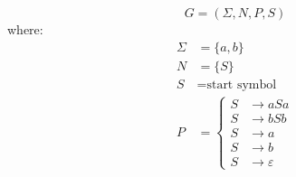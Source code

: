 \documentclass[aspectratio=169]{beamer}
\begin{document}
\begin{wallpaperframe}
\[
G = (\Sigma, N, P, S)
\]
where:
\begin{align*}
\Sigma &= \{a, b\} \\
N &= \{S\} \\
S &= \text{start symbol} \\
P &= \left\{
\begin{array}{rl}
S &\rightarrow aSa \\
S &\rightarrow bSb \\
S &\rightarrow a \\
S &\rightarrow b \\
S &\rightarrow \varepsilon
\end{array}
\right.
\end{align*}
\end{wallpaperframe}
\end{document}
